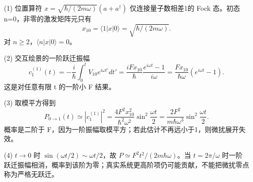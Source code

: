 (1) 位置算符 \(x=\sqrt{\hbar/(2m\omega)}(a+a^\dagger)\) 仅连接量子数相差1的 Fock 态。初态 n=0，非零的激发矩阵元只有
\[
x_{10}=\langle1|x|0\rangle=\sqrt{\hbar/(2m\omega)}.
\]
对 \(n\ge 2\)，\(\langle n|x|0\rangle=0\)。

(2) 交互绘景的一阶跃迁振幅
\[
c_1^{(1)}(t)=-\frac i\hbar\int_0^t V_{10}e^{i\omega t'}dt'
=\frac{iFx_{10}}{\hbar}\frac{e^{i\omega t}-1}{i\omega}
=\frac{Fx_{10}}{\hbar\omega}(e^{i\omega t}-1).
\]
这是对任意有限 t 的一阶小 F 结果。

(3) 取模平方得到
\[
P_{0\to1}(t)\simeq |c_1^{(1)}|^2
=\frac{4F^2x_{10}^2}{\hbar^2\omega^2}\sin^2\frac{\omega t}2
=\frac{2F^2}{m\hbar\omega^3}\sin^2\frac{\omega t}2.
\]
概率是二阶于 F，因为一阶振幅取模平方；若此估计不再远小于1，则微扰展开失效。

(4) \(t\to0\) 时 \(\sin(\omega t/2)\sim\omega t/2\)，故 \(P\simeq F^2t^2/(2m\hbar\omega)\)。当 \(t=2\pi/\omega\) 时一阶跃迁振幅相消，概率到该阶为零；真实系统更高阶项仍可能贡献，不能把微扰零点称为严格无跃迁。
